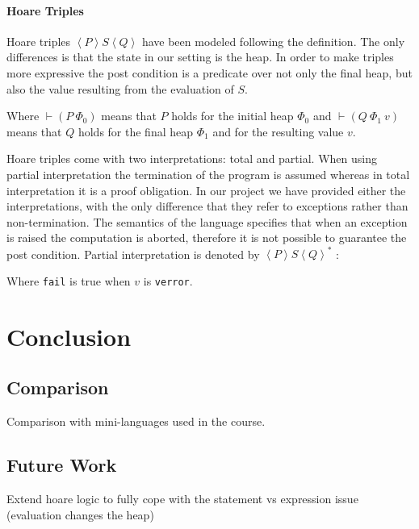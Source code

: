 \documentclass[12pt, a4paper, oneside]{article}
\newcommand{\sproof}{
  \scriptsize
  \begin{center}
  \begin{prooftree}
  \def\defaultHypSeparation{\hskip .1in}
}
\newcommand{\eproof}{
  \end{prooftree}
  \end{center}
  \normalsize
}
\begin{document}
\paragraph{Hoare Triples}
Hoare triples $ \left\langle P \right\rangle   S \left\langle Q \right\rangle$ have been modeled following the definition. The only differences is that the state in our  setting is the heap. In order to make triples more expressive the post condition is a predicate over not only the final heap, but also the value resulting from the evaluation of $S$.

\sproof
{}
\eproof
Where $\vdash (P\  \Phi_0)$ means that $P$ holds for the initial heap $\Phi_0$ and $\vdash (Q\ \Phi_1\ v)$ means that $Q$ holds for the final heap $\Phi_1$ and for the resulting value $v$.

Hoare triples come with two interpretations: total and partial.
When using partial interpretation the termination of the program is assumed whereas in total interpretation it is a proof obligation.
In our project we have provided either the interpretations, with the only difference that they refer to exceptions rather than non-termination.
The semantics of the language specifies that when an exception is raised the computation is aborted, therefore it is not possible to guarantee the post condition.
Partial interpretation is denoted by $ \left\langle P \right\rangle  S \left\langle Q \right\rangle^*$ :
\sproof
{}
\eproof
Where \texttt{fail} is true when $v$ is \texttt{verror}.

\section{Conclusion}

\subsection{Comparison}
Comparison with mini-languages used in the course.

\subsection{Future Work}
Extend hoare logic to fully cope with the statement vs expression issue (evaluation changes the heap) 
\end{document}
